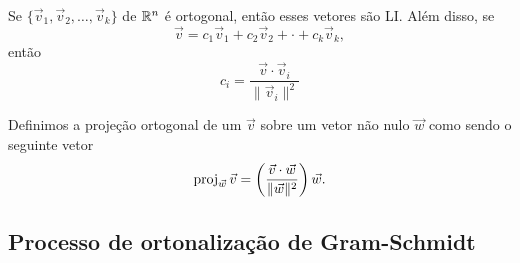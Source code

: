 \begin{frame}[label=orto]{}
\begin{teo}
Se $\{\vec{v}_1,\vec{v}_2,\ldots, \vec{v}_k\}$  de $\mathbb{R}^n$  é ortogonal, então esses vetores são LI. Além disso, se
\[\vec{v}=c_1\vec{v}_1+c_2\vec{v}_2+\cdot +c_k\vec{v}_k,\]
então
\[c_i=\frac{\vec{v}\cdot \vec{v}_i}{\|\vec{v}_i\|^2}\] 
\end{teo}

\begin{defin}
Definimos a {\color{blue}projeção ortogonal} de um $\vec{v}$ sobre um vetor  {\color{red} não nulo} $\vec{w}$ como sendo o seguinte vetor
\[\operatorname{proj}_{\vec{w}}\vec{v}=\left(\frac{\vec{v}\cdot \vec{w}}{\|\vec{w}\|^2}\right)\vec{w}.\]
\end{defin}


\end{frame}

%


\subsection*{Processo de ortonalização de Gram-Schmidt}
%
%


